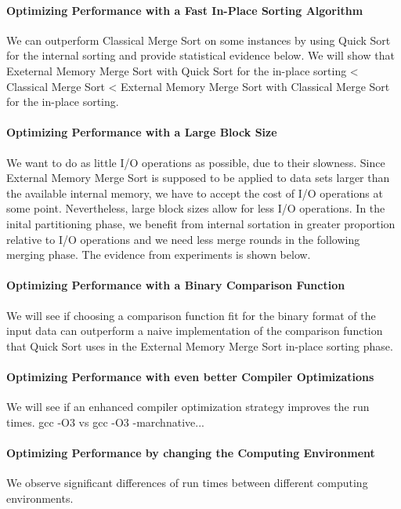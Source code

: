 \documentclass[twocolumn]{article}
\begin{document}
\paragraph*{Optimizing Performance with a Fast In-Place Sorting Algorithm}
We can outperform Classical Merge Sort on some instances by using Quick Sort for the internal sorting and provide statistical evidence below.
We will show that Exeternal Memory Merge Sort with Quick Sort for the in-place sorting < Classical Merge Sort < External Memory Merge Sort with Classical Merge Sort for the in-place sorting.

\paragraph*{Optimizing Performance with a Large Block Size}
We want to do as little I/O operations as possible, due to their slowness. Since External Memory Merge Sort is supposed to be applied to data sets larger than the available internal memory,
we have to accept the cost of I/O operations at some point. Nevertheless, large block sizes allow for less I/O operations. In the inital partitioning phase, we benefit from internal sortation
in greater proportion relative to I/O operations and we need less merge rounds in the following merging phase.
The evidence from experiments is shown below.

\paragraph*{Optimizing Performance with a Binary Comparison Function}
We will see if choosing a comparison function fit for the binary format of the input data can outperform a naive implementation of the comparison function that Quick Sort uses
in the External Memory Merge Sort in-place sorting phase.

\paragraph*{Optimizing Performance with even better Compiler Optimizations}
We will see if an enhanced compiler optimization strategy improves the run times.
gcc -O3 vs gcc -O3 -marchnative...

\paragraph*{Optimizing Performance by changing the Computing Environment}
We observe significant differences of run times between different computing environments.
\end{document}
